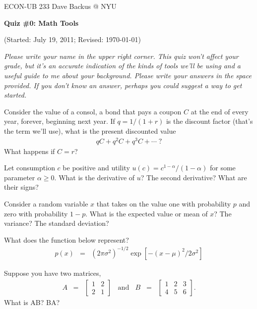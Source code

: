 \documentclass[11pt]{exam}
\begin{document}
\bigskipamount
\parindent=0.0in
\thispagestyle{empty}
{\large ECON-UB 233 \hfill Dave Backus @ NYU}

\bigskip\bigskip
\centerline{\Large \bf Quiz \#0:  Math Tools}
\centerline{(Started: July 19, 2011; Revised: \today)}

{\it Please write your name in the upper right corner.  
This quiz won't affect your grade, but it's an accurate indication of the kinds of tools
we'll be using and a useful guide to me about your background.  
Please write your answers in the space provided.
If you don't know an answer, perhaps you could suggest a way to get started.}

\begin{questions}
\question Consider the value of a consol,
a bond that pays a coupon $C$ at the end of every year, forever,
beginning next year.
If $q = 1/(1+r)$ is the discount factor (that's the term we'll use),
what is the present discounted value
\begin{eqnarray*}
    q C + q^2 C + q^3 C + \cdots \; ?
\end{eqnarray*}
What happens if $C=r$?

\vspace{2.5in}
\question Let consumption $c$ be positive and utility
$u(c) = c^{1-\alpha}/(1-\alpha)$ for some parameter $\alpha \geq 0$.
What is the derivative of $u$?
The second derivative?
What are their signs?

\pagebreak
\question Consider a random variable $x$ that takes on the value one with probability $p$
and zero with probability $1-p$.
What is the expected value or mean of $x$?
The variance?  The standard deviation?


\vspace{2in}
\question What does the function below represent?  
\begin{eqnarray*}
    p(x) &=& (2 \pi \sigma^2)^{-1/2} \exp[ - (x-\mu)^2/2 \sigma^2] 
\end{eqnarray*}

\vspace{2in}
\question Suppose you have two matrices,
\begin{eqnarray*}
A \;\;=\;\; \left[
            \begin{array}{cc}
            1 & 2 \\ 2 & 1
            \end{array}
            \right] \;\;\mbox{ and }\;\;
B \;\;=\;\; \left[
            \begin{array}{ccc}
            1 & 2 & 3 \\ 4 & 5 & 6
            \end{array}
            \right] .
\end{eqnarray*}
What is AB?  BA?
\end{questions}
\end{document}
